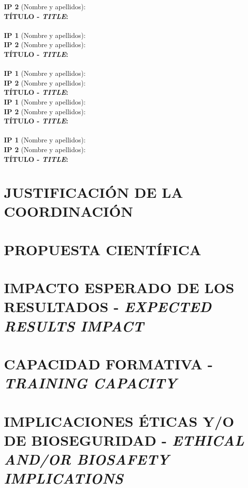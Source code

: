 \documentclass[a4paper,11pt,oneside]{article}
\begin{document}
{\bf IP 2} (Nombre y apellidos):\\
{\bf T\'ITULO - \emph{TITLE}:}\\
\\
{\bf IP 1} (Nombre y apellidos):\\
{\bf IP 2} (Nombre y apellidos):\\
{\bf T\'ITULO - \emph{TITLE}:}\\
\\
{\bf IP 1} (Nombre y apellidos):\\
{\bf IP 2} (Nombre y apellidos):\\
{\bf T\'ITULO - \emph{TITLE}:}
\\
{\bf IP 1} (Nombre y apellidos):\\
{\bf IP 2} (Nombre y apellidos):\\
{\bf T\'ITULO - \emph{TITLE}:}\\
\\
{\bf IP 1} (Nombre y apellidos):\\
{\bf IP 2} (Nombre y apellidos):\\
{\bf T\'ITULO - \emph{TITLE}:}\\

\section{JUSTIFICACI\'ON DE LA COORDINACI\'ON}

\section{PROPUESTA CIENT\'IFICA}

\section{IMPACTO ESPERADO DE LOS RESULTADOS - \emph{EXPECTED RESULTS IMPACT}}

\section{CAPACIDAD FORMATIVA - \emph{TRAINING CAPACITY}}

\section{IMPLICACIONES \'ETICAS Y/O DE BIOSEGURIDAD - \emph{ETHICAL AND/OR BIOSAFETY IMPLICATIONS}}
\end{document}
